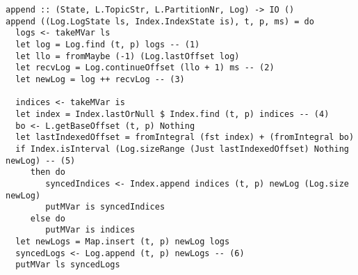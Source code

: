 \begin{lstlisting}[caption={Append function exposed by LogManager}]
append :: (State, L.TopicStr, L.PartitionNr, Log) -> IO ()
append ((Log.LogState ls, Index.IndexState is), t, p, ms) = do
  logs <- takeMVar ls
  let log = Log.find (t, p) logs -- (1)
  let llo = fromMaybe (-1) (Log.lastOffset log)
  let recvLog = Log.continueOffset (llo + 1) ms -- (2)
  let newLog = log ++ recvLog -- (3)

  indices <- takeMVar is
  let index = Index.lastOrNull $ Index.find (t, p) indices -- (4)
  bo <- L.getBaseOffset (t, p) Nothing
  let lastIndexedOffset = fromIntegral (fst index) + (fromIntegral bo)
  if Index.isInterval (Log.sizeRange (Just lastIndexedOffset) Nothing newLog) -- (5)
     then do
        syncedIndices <- Index.append indices (t, p) newLog (Log.size newLog)
        putMVar is syncedIndices
     else do
        putMVar is indices
  let newLogs = Map.insert (t, p) newLog logs
  syncedLogs <- Log.append (t, p) newLogs -- (6)
  putMVar ls syncedLogs
\end{lstlisting}

